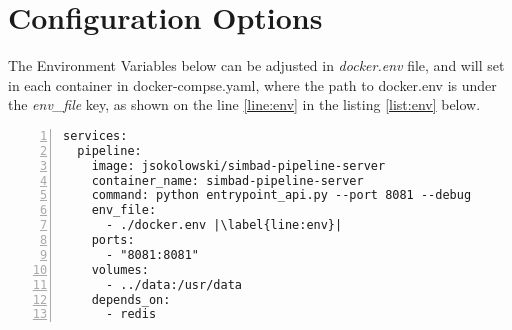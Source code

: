 \chapter*{Configuration Options}\mbox{}
\label{appendix:configuration}
The Environment Variables below can be adjusted in \textit{docker.env} file, and will set in each container in docker-compse.yaml, where the path to docker.env is under the \textit{env\_file} key, as shown on the line \ref{line:env} in the listing \ref{list:env} below.
\begin{lstlisting}[label=list:env,caption=Example of passing \textit{docker.env} file to the container, basicstyle=\footnotesize\ttfamily, escapechar=|, numbers=left]
services:
  pipeline:
    image: jsokolowski/simbad-pipeline-server
    container_name: simbad-pipeline-server
    command: python entrypoint_api.py --port 8081 --debug
    env_file:
      - ./docker.env |\label{line:env}|
    ports:
      - "8081:8081"
    volumes:
      - ../data:/usr/data
    depends_on:
      - redis
\end{lstlisting}
\label{sec:conf-opts}
